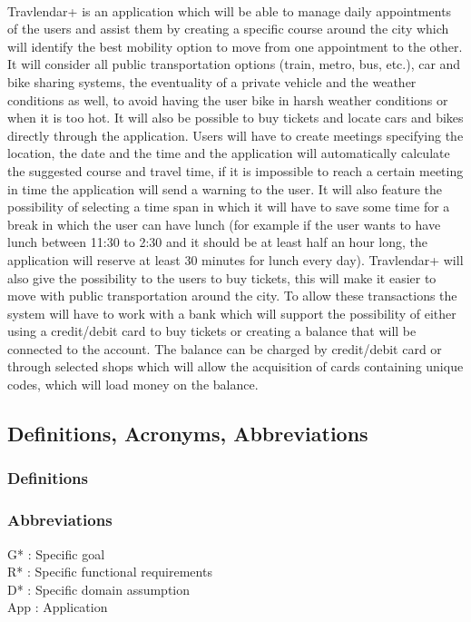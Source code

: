 \documentclass{article}
\begin{document}
\paragraph{}
Travlendar+ is an application which will be able to manage daily appointments of the users and assist them by creating a specific course around the city which will identify the best mobility option to move from one appointment to the other. It will consider all public transportation options (train, metro, bus, etc.), car and bike sharing systems, the eventuality of a private vehicle and the weather conditions as well, to avoid having the user bike in harsh weather conditions or when it is too hot. It will also be possible to buy tickets and locate cars and bikes directly through the application. Users will have to create meetings specifying the location, the date and the time and the application will automatically calculate the suggested course and travel time, if it is impossible to reach a certain meeting in time the application will send a warning to the user. It will also feature the possibility of selecting a time span in which it will have to save some time for a break in which the user can have lunch (for example if the user wants to have lunch between 11:30 to 2:30 and it should be at least half an hour long, the application will reserve at least 30 minutes for lunch every day). Travlendar+ will also give the possibility to the users to buy tickets, this will make it easier to move with public transportation around the city. To allow these transactions the system will have to work with a bank which will support the possibility of either using a credit/debit card to buy tickets or creating a balance that will be connected to the account. The balance can be charged by credit/debit card or through selected shops which will allow the acquisition of cards containing unique codes, which will load money on the balance.
\subsection{Definitions, Acronyms, Abbreviations}
\subsubsection{Definitions}
\subsubsection{Abbreviations}
G* : Specific goal\\ R* : Specific functional requirements\\ D* : Specific domain assumption \\ App : Application
\end{document}
